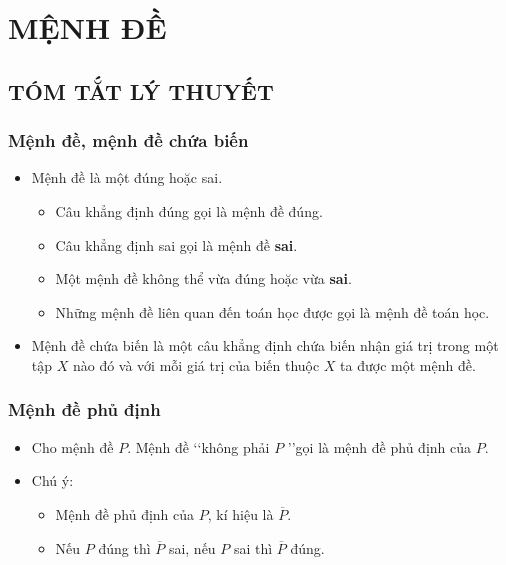 \section{MỆNH ĐỀ}

\subsection{TÓM TẮT LÝ THUYẾT}
\subsubsection{Mệnh đề, mệnh đề chứa biến}
\begin{itemize}
	\item [\iconMT]  Mệnh đề là một  đúng hoặc sai. 
	\begin{boxkn}
		\begin{itemize}
			\item Câu khẳng định đúng gọi là mệnh đề đúng.
			\item Câu khẳng định sai gọi là mệnh đề \textbf{sai}.
			\item Một mệnh đề không thể vừa đúng hoặc vừa \textbf{sai}.
			\item Những mệnh đề liên quan đến toán học được gọi là mệnh đề toán học.
		\end{itemize} 
	\end{boxkn}
	\item [\iconMT]  Mệnh đề chứa biến là một câu khẳng định chứa biến nhận giá trị trong một tập $X$ nào đó và với mỗi giá trị của biến thuộc $X$ ta được một mệnh đề.
	
\end{itemize}
\subsubsection{Mệnh đề phủ định}
\begin{itemize}
	\item [\iconMT] Cho mệnh đề $P$. Mệnh đề \lq\lq không phải $P$ \rq\rq gọi là mệnh đề phủ định của $P$.
	\item [\iconMT] Chú ý: 
		\begin{boxkn}
	\begin{itemize}
		\item  Mệnh đề phủ định của $P$, kí hiệu là $\overline{P}$.
		\item  Nếu $P$ đúng thì $\overline{P}$ sai, nếu $P$ sai thì $\overline{P}$ đúng.
	\end{itemize}
	\end{boxkn}
\end{itemize}
